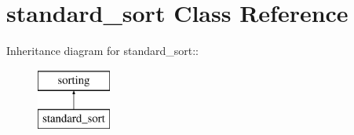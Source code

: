 \hypertarget{classstandard__sort}{
\section{standard\_\-sort Class Reference}
\label{d4/dec/classstandard__sort}
}
Inheritance diagram for standard\_\-sort::\begin{figure}[H]
\begin{center}
\leavevmode
\includegraphics[height=2cm]{d4/dec/classstandard__sort}
\end{center}
\end{figure}
